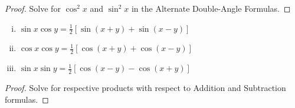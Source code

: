 \documentclass[a4paper,11pt]{article}
\begin{document}
\begin{outline}
    \begin{proof}
      Solve for \(\cos^2 x\) and \(\sin^2 x\) in the Alternate Double-Angle Formulas.
    \end{proof}
    
    \begin{enumerate}[i.]
      \item \(\sin{x}\cos{y} = \frac{1}{2}\left[\sin{(x+y)} + \sin{(x-y)}\right]\)
      \item \(\cos{x}\cos{y} = \frac{1}{2}\left[\cos{(x+y)} + \cos{(x-y)}\right]\)
      \item \(\sin{x}\sin{y} = \frac{1}{2}\left[\cos{(x-y)} - \cos{(x+y)}\right]\)
    \end{enumerate}

    \begin{proof}
      Solve for respective products with respect to Addition and Subtraction formulas.
    \end{proof}

\end{outline}
\end{document}
